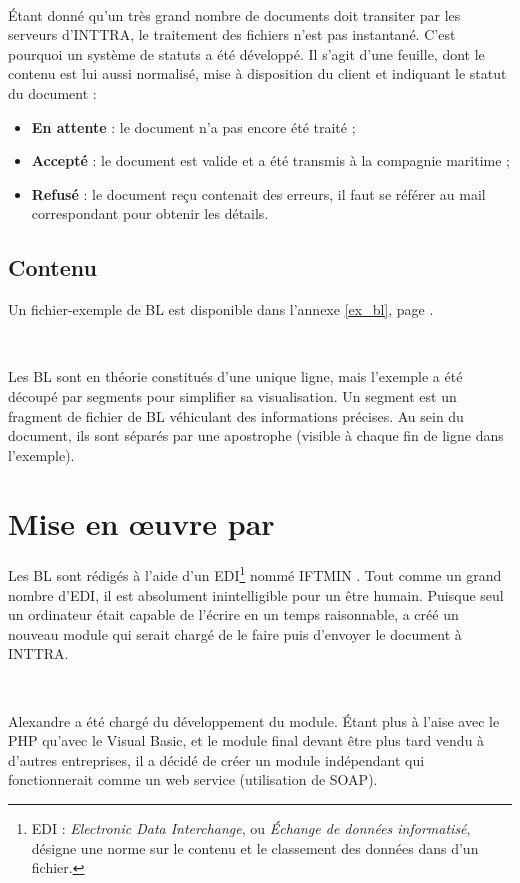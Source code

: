 ~

\'Etant donné qu'un très grand nombre de documents doit transiter par les serveurs d'INTTRA, le traitement des fichiers n'est pas instantané. C'est pourquoi un système de \og statuts \fg {} a été développé. Il s'agit d'une feuille, dont le contenu est lui aussi normalisé, mise à disposition du client et indiquant le statut du document :
\begin{itemize}
	\item \textbf{En attente} : le document n'a pas encore été traité ;
	\item \textbf{Accepté} : le document est valide et a été transmis à la compagnie maritime ;
	\item \textbf{Refusé} : le document reçu contenait des erreurs, il faut se référer au mail correspondant pour obtenir les détails.
\end{itemize}


\subsection{Contenu}
Un fichier-exemple de BL est disponible dans l'annexe \ref{ex_bl}, page \pageref{ex_bl}.

~

Les BL sont en théorie constitués d'une unique ligne, mais l'exemple a été découpé par segments pour simplifier sa visualisation. Un segment est un fragment de fichier de BL véhiculant des informations précises. Au sein du document, ils sont séparés par une apostrophe (visible à chaque fin de ligne dans l'exemple).
\vfill


\section{Mise en \oe{uvre} par \solulog}
Les BL sont rédigés à l'aide d'un EDI\footnote{EDI : \emph{Electronic Data Interchange}, ou \emph{\'Echange de données informatisé}, désigne une \og norme \fg{}sur le contenu et le classement des données dans d'un fichier.} nommé \og IFTMIN \fg. Tout comme un grand nombre d'EDI, il est absolument inintelligible pour un être humain. Puisque seul un ordinateur était capable de l'écrire en un temps raisonnable, \solulog{} a créé un nouveau  module qui serait chargé de le faire puis d'envoyer le document à INTTRA.

~

Alexandre a été chargé du développement du module. \'Etant plus à l'aise avec le PHP qu'avec le Visual Basic, et le module final devant être plus tard vendu à d'autres entreprises, il a décidé de créer un module indépendant qui fonctionnerait comme un web service (utilisation de SOAP).


